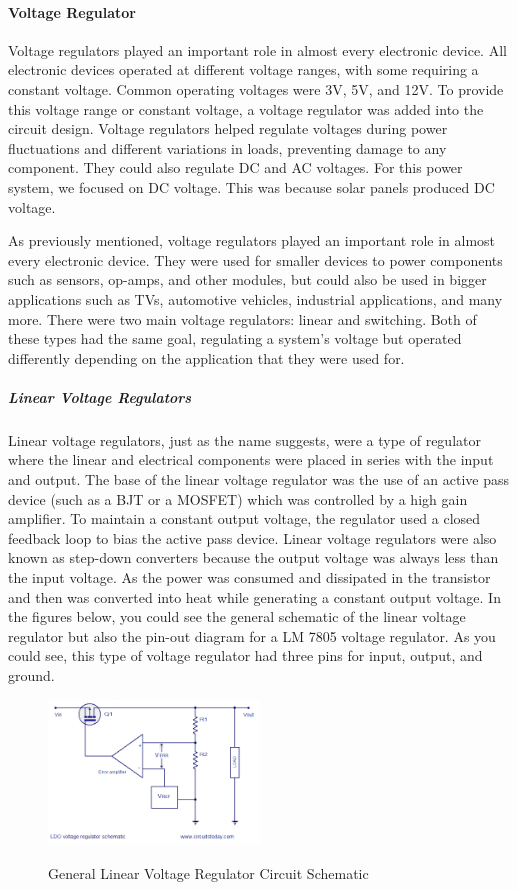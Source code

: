 \paragraph{Voltage Regulator}
Voltage regulators played an important role in almost every electronic device. All electronic devices operated at different voltage ranges, with some requiring a constant voltage. Common operating voltages were 3V, 5V, and 12V. To provide this voltage range or constant voltage, a voltage regulator was added into the circuit design. Voltage regulators helped regulate voltages during power fluctuations and different variations in loads, preventing damage to any component. They could also regulate DC and AC voltages. For this power system, we focused on DC voltage. This was because solar panels produced DC voltage.

As previously mentioned, voltage regulators played an important role in almost every electronic device. They were used for smaller devices to power components such as sensors, op-amps, and other modules, but could also be used in bigger applications such as TVs, automotive vehicles, industrial applications, and many more. There were two main voltage regulators: linear and switching. Both of these types had the same goal, regulating a system’s voltage but operated differently depending on the application that they were used for.
\subparagraph{Linear Voltage Regulators}
Linear voltage regulators, just as the name suggests, were a type of regulator where the linear and electrical components were placed in series with the input and output. The base of the linear voltage regulator was the use of an active pass device (such as a BJT or a MOSFET) which was controlled by a high gain amplifier. To maintain a constant output voltage, the regulator used a closed feedback loop to bias the active pass device. Linear voltage regulators were also known as step-down converters because the output voltage was always less than the input voltage. As the power was consumed and dissipated in the transistor and then was converted into heat while generating a constant output voltage. In the figures below, you could see the general schematic of the linear voltage regulator but also the pin-out diagram for a LM 7805 voltage regulator. As you could see, this type of voltage regulator had three pins for input, output, and ground.
\begin{figure}[H]
    \caption{General Linear Voltage Regulator Circuit Schematic}
    \centering
    \includegraphics[width=0.5\textwidth]{images/Gen_Linear_Voltage_Regulator.png}
    \label{fig:general-linear-voltage-regulator}
\end{figure}
